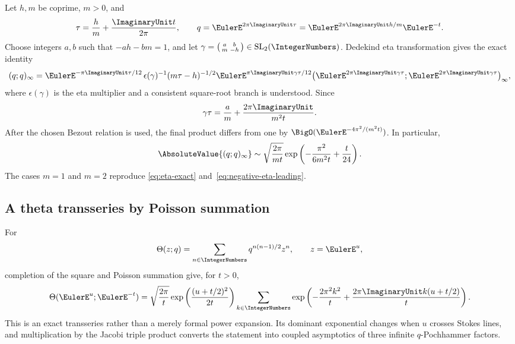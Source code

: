 \documentclass[11pt,oneside]{article}
\theoremstyle{definition}
\theoremstyle{remark}
\let\reportsubsection\subsection
\let\section\reportsubsection
\begin{document}
Let $h,m$ be coprime, $m>0$, and
\[
 \tau=\frac hm+\frac{\ImaginaryUnit t}{2\pi},
 \qquad q=\EulerE^{2\pi\ImaginaryUnit\tau}=\EulerE^{2\pi\ImaginaryUnit h/m}\EulerE^{-t}.
\]
Choose integers $a,b$ such that
\(
-ah-bm=1
\), and let
\(
\gamma=\begin{psmallmatrix}a&b\\m&-h\end{psmallmatrix}
\in\mathrm{SL}_2(\IntegerNumbers)
\).  Dedekind eta transformation gives the exact identity
\begin{equation}\label{eq:general-cusp-exact}
 (q;q)_\infty
 =\EulerE^{-\pi\ImaginaryUnit\tau/12}\,
 \epsilon(\gamma)^{-1}(m\tau-h)^{-1/2}
 \EulerE^{\pi\ImaginaryUnit\gamma\tau/12}
 \bigl(\EulerE^{2\pi\ImaginaryUnit\gamma\tau};
       \EulerE^{2\pi\ImaginaryUnit\gamma\tau}\bigr)_\infty,
\end{equation}
where $\epsilon(\gamma)$ is the eta multiplier and a consistent square-root
branch is understood.  Since
\[
 \gamma\tau=\frac am+\frac{2\pi\ImaginaryUnit}{m^2t}.
\]
After the chosen Bezout relation is used, the final product differs from one by
$\BigO(\EulerE^{-4\pi^2/(m^2t)})$.  In particular,
\begin{equation}\label{eq:general-cusp-magnitude}
 \AbsoluteValue{(q;q)_\infty}
 \sim\sqrt{\frac{2\pi}{mt}}
 \exp\left(-\frac{\pi^2}{6m^2t}+\frac{t}{24}\right).
\end{equation}
The cases $m=1$ and $m=2$ reproduce
\eqref{eq:eta-exact} and~\eqref{eq:negative-eta-leading}.

\section{A theta transseries by Poisson summation}

For
\[
 \Theta(z;q)=\sum_{n\in\IntegerNumbers}q^{n(n-1)/2}z^n,
 \qquad z=\EulerE^u,
\]
completion of the square and Poisson summation give, for $t>0$,
\begin{equation}\label{eq:theta-poisson}
 \Theta(\EulerE^u;\EulerE^{-t})
 =\sqrt{\frac{2\pi}{t}}
 \exp\left(\frac{(u+t/2)^2}{2t}\right)
 \sum_{k\in\IntegerNumbers}
 \exp\left(-\frac{2\pi^2k^2}{t}
 +\frac{2\pi\ImaginaryUnit k(u+t/2)}{t}\right).
\end{equation}
This is an exact transseries rather than a merely formal power expansion.  Its
dominant exponential changes when $u$ crosses Stokes lines, and multiplication
by the Jacobi triple product converts the statement into coupled asymptotics of
three infinite $q$-Pochhammer factors.
\end{document}

